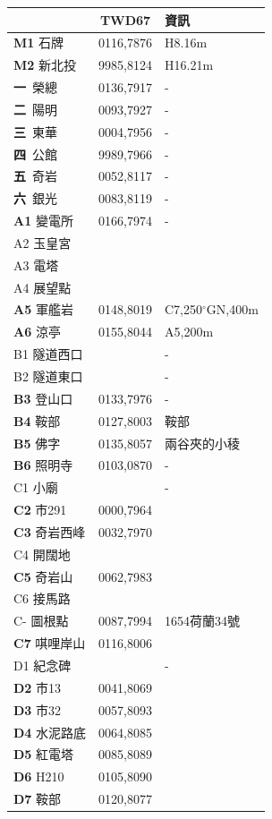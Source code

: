 \documentclass{article}
\begin{document}
\begin{CJK*}{UTF8}{bkai}
\begin{multicols}{2}
\begin{tabular}{|l|c|l|}
	\hline
	&TWD67&資訊\\  
	\hline
	\textbf{M1} 石牌&0116,7876&H8.16m\\
	\textbf{M2} 新北投&9985,8124&H16.21m\\
	\hline
	\textbf{一}\ 榮總&0136,7917&-\\
	\textbf{二}\ 陽明&0093,7927&-\\
	\textbf{三}\ 東華&0004,7956&-\\
	\textbf{四}\ 公館&9989,7966&-\\
	\textbf{五}\ 奇岩&0052,8117&-\\
	\textbf{六}\ 銀光&0083,8119&-\\
	\hline
	\textbf{A1} 變電所&0166,7974&-\\
	A2 玉皇宮& &\\
	A3 電塔& &\\
	A4 展望點& &\\
	\textbf{A5} 軍艦岩&0148,8019&C7,250$^{\circ}$GN,400m\\
	\textbf{A6} 涼亭&0155,8044&A5,200m\\
	\hline
	B1 隧道西口& &-\\
	B2 隧道東口& &-\\
	\textbf{B3} 登山口&0133,7976&-\\
	\textbf{B4} 鞍部&0127,8003&鞍部\\
	\textbf{B5} 佛字&0135,8057&兩谷夾的小稜\\
	\textbf{B6} 照明寺&0103,0870&-\\
	\hline
	C1 小廟& &-\\
	\textbf{C2} 市291&0000,7964&\\
	\textbf{C3} 奇岩西峰&0032,7970&\\
	C4 開闊地& &\\
	\textbf{C5} 奇岩山&0062,7983&\\
	C6 接馬路& &\\
	C- 圖根點&0087,7994&1654荷蘭34號\\
	\textbf{C7} 唭哩岸山&0116,8006&\\
	\hline
	D1 紀念碑& &-\\
	\textbf{D2} 市13&0041,8069&\\
	\textbf{D3} 市32&0057,8093&\\
	\textbf{D4} 水泥路底&0064,8085&\\
	\textbf{D5} 紅電塔&0085,8089&\\
	\textbf{D6} H210&0105,8090&\\
	\textbf{D7} 鞍部&0120,8077&\\

\end{tabular}
\end{multicols}
\end{CJK*}
\end{document}
